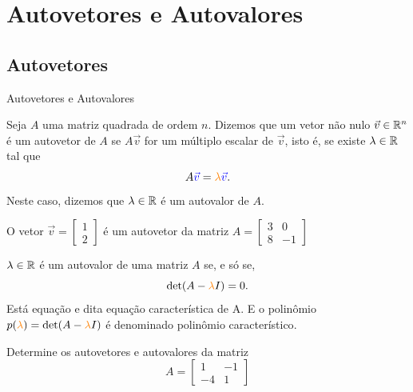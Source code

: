 \section{Autovetores e Autovalores}

\subsection*{Autovetores}

\begin{frame}[label=autovalores]{Autovetores e Autovalores}

\begin{defin}
Seja $A$ uma matriz quadrada de ordem $n$. Dizemos que um vetor {\color{red}não nulo} {\color{blue}$\vec{v}\in \mathbb{R}^n$} é um  {\color{blue}autovetor} de $A$ se $A\vec{v}$ for um múltiplo escalar de $\vec{v}$, isto é, se existe  {\color{orange}$\lambda \in \mathbb{R}$} tal que 
\[A{\color{blue}\vec{v}}={\color{orange}\lambda} {\color{blue}\vec{v}}.\]
Neste caso, dizemos que {\color{orange}$\lambda \in \mathbb{R}$} é um {\color{orange}autovalor} de $A$.

\end{defin}

\begin{exe}
O vetor $\vec{v}=\begin{bmatrix} 1\\2 \end{bmatrix}$ é um autovetor da matriz
$A=\begin{bmatrix}
3 & 0 \\ 8 & -1
\end{bmatrix}
$
\end{exe}

\end{frame}

\begin{frame}[label=autovalores]{}
\begin{teo}
{\color{orange}$\lambda \in \mathbb{R}$} é um autovalor de uma matriz $A$ se, e só se, 
\[\det(A-{\color{orange}\lambda}I)=0.\]
Está equação e dita {\color{blue}equação característica de A}. E o polinômio $p({\color{orange}\lambda})=\det(A-{\color{orange}\lambda} I)$ é denominado {\color{blue}polinômio característico}.
\end{teo}

\begin{exe}
Determine os autovetores e autovalores da matriz
\[A=
\begin{bmatrix}
1 & -1 \\ -4 & 1
\end{bmatrix}
\]
\end{exe}
\end{frame}



